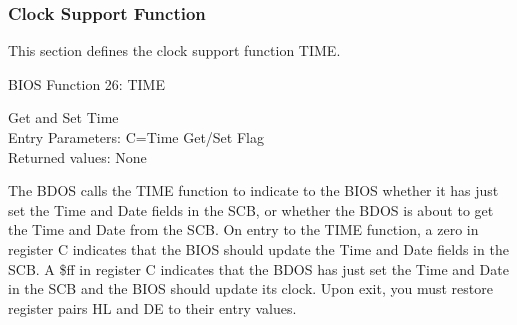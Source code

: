 \subsubsection{Clock Support Function}
This section defines the clock support function TIME.

BIOS Function 26: TIME

Get and Set Time\\
Entry Parameters: C=Time Get/Set Flag\\
Returned values: None

The BDOS calls the TIME function to indicate to the BIOS whether it
has just set the Time and Date fields in the SCB, or whether the BDOS
is about to get the Time and Date from the SCB. On entry to the TIME
function, a zero in register C indicates that the BIOS should update
the Time and Date fields in the SCB. A \$ff in register C indicates
that the BDOS has just set the Time and Date in the SCB and the BIOS
should update its clock. Upon exit, you must restore register pairs HL
and DE to their entry values.
